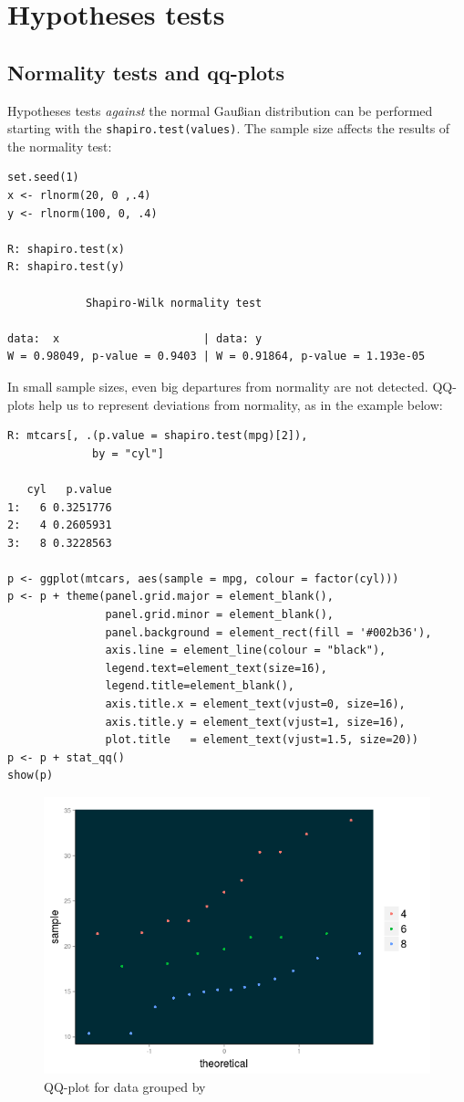 \chapter{Hypotheses tests}\label{sec: tests}
\section{Normality tests and qq-plots}
Hypotheses tests \emph{against} the normal 
Gau\ss ian distribution can be performed 
starting with the \texttt{shapiro.test(values)}.
The sample size affects
the results of the normality test:
\begin{verbatim}
set.seed(1)
x <- rlnorm(20, 0 ,.4)
y <- rlnorm(100, 0, .4)

R: shapiro.test(x)
R: shapiro.test(y)

	        Shapiro-Wilk normality test

data:  x                      | data: y
W = 0.98049, p-value = 0.9403 | W = 0.91864, p-value = 1.193e-05
\end{verbatim}
In small sample sizes, even big departures from
normality are not detected. QQ-plots help us to
represent deviations from normality, as in the
example below:
\begin{verbatim}
R: mtcars[, .(p.value = shapiro.test(mpg)[2]), 
             by = "cyl"]

   cyl   p.value
1:   6 0.3251776
2:   4 0.2605931
3:   8 0.3228563

p <- ggplot(mtcars, aes(sample = mpg, colour = factor(cyl)))
p <- p + theme(panel.grid.major = element_blank(), 
               panel.grid.minor = element_blank(),
               panel.background = element_rect(fill = '#002b36'),
               axis.line = element_line(colour = "black"),
               legend.text=element_text(size=16),
               legend.title=element_blank(),
               axis.title.x = element_text(vjust=0, size=16),
               axis.title.y = element_text(vjust=1, size=16),
               plot.title   = element_text(vjust=1.5, size=20)) 
p <- p + stat_qq()
show(p)
\end{verbatim}
\begin{figure}[htbp]
 \centering
 \includegraphics[scale=.6]{images/qqplots}
 \caption*{QQ-plot for data grouped by}
\end{figure}
